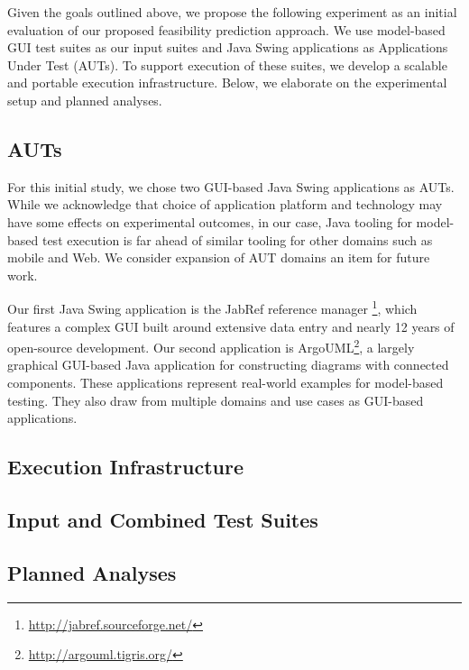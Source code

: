 Given the goals outlined above, we propose the following experiment as an
initial evaluation of our proposed feasibility prediction approach. We use
model-based GUI test suites as our input suites and Java Swing applications as
Applications Under Test (AUTs). To support execution of these suites, we
develop a scalable and portable execution infrastructure. Below, we elaborate
on the experimental setup and planned analyses.

\subsection{AUTs}

For this initial study, we chose two GUI-based Java Swing applications as
AUTs. While we acknowledge that choice of application platform and technology
may have some effects on experimental outcomes, in our case, Java tooling
for model-based test execution is far ahead of similar tooling for other
domains such as mobile and Web. We consider expansion of AUT domains an item
for future work.

Our first Java Swing application is the JabRef reference manager
\footnote{\url{http://jabref.sourceforge.net/}}, which features a complex
GUI built around extensive data entry and nearly 12 years of
open-source development. Our second application is
ArgoUML\footnote{\url{http://argouml.tigris.org/}}, a largely graphical
GUI-based Java application for constructing diagrams with connected
components. These applications represent real-world examples for model-based
testing. They also draw from multiple domains and use cases as GUI-based
applications.

\subsection{Execution Infrastructure}



\subsection{Input and Combined Test Suites}

\subsection{Planned Analyses}
